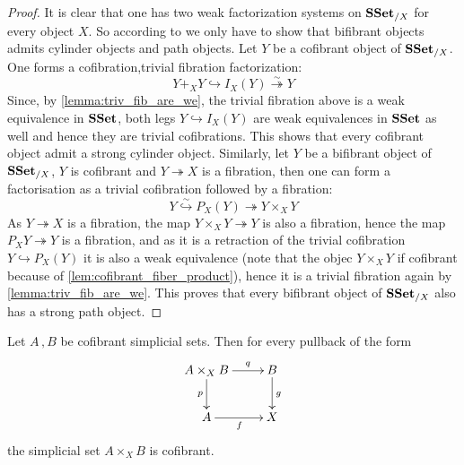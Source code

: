 \documentclass[reqno,10pt,a4paper,oneside,draft]{amsart}
\begin{document}
\begin{proof}

It is clear that one has two weak factorization systems on $\mathbf{SSet}_{/X}$ for every object $X$. So according to \cite[Definition~2.1.11]{henry2018wms} we only have to show that bifibrant objects admits cylinder objects and path objects. Let $Y$ be a cofibrant object of $\mathbf{SSet}_{/X}$. One forms a cofibration,trivial fibration factorization:
\[ 
Y +_X Y \hookrightarrow I_X(Y) \overset{\sim}{\twoheadrightarrow} Y 
\]
Since, by  \cref{lemma:triv_fib_are_we}, the trivial fibration above is a weak equivalence in $\mathbf{SSet}$, both legs $Y \hookrightarrow I_X(Y)$ are weak equivalences in $\mathbf{SSet}$ as well and hence they are trivial cofibrations. This shows that every cofibrant object admit a strong cylinder object. Similarly, let $Y$ be a bifibrant object of $\mathbf{SSet}_{/X}$, \ie $Y$ is cofibrant and $Y \twoheadrightarrow X$ is a fibration, then one can form a factorisation as a trivial cofibration followed by a fibration:
\[ 
Y \overset{\sim}{\hookrightarrow} P_X(Y) {\twoheadrightarrow} Y \times_{X} Y 
\]
As $Y \twoheadrightarrow X$ is a fibration, the map $Y \times_X Y \twoheadrightarrow Y$ is also a fibration, hence the map $P_X Y \twoheadrightarrow Y$ is a fibration, and as it is a retraction of the trivial cofibration $Y \hookrightarrow P_X(Y)$ it is also a weak equivalence (note that the objec $Y \times_X Y$ if cofibrant because of \cref{lem:cofibrant_fiber_product}), hence it is a trivial fibration again by \cref{lemma:triv_fib_are_we}. This proves that every bifibrant object of $\mathbf{SSet}_{/X}$ also has a strong path object.
\end{proof}



\bigskip


\begin{lemma}\label{lem:cofibrant_fiber_product}
Let $A \, , B$ be cofibrant simplicial sets. Then for every pullback of the form
\[
\xymatrix{
A \times_X B \ar[r]^-{q} \ar[d]_-{p} & B \ar[d]^g \\
A \ar[r]_f & X }
\]
the simplicial set $A \times_{X} B$ is cofibrant.
\end{lemma}
\end{document}
